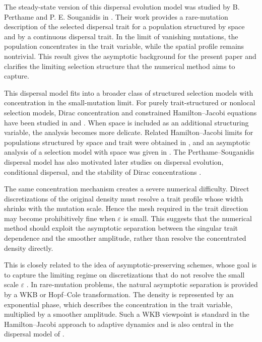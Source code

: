 \documentclass[11pt]{article}
\begin{document}
The steady-state version of this dispersal evolution model was studied by
B. Perthame and P. E. Souganidis in \cite{PerthameSouganidis}.  Their work provides a
rare-mutation description of the selected dispersal trait for a population
structured by space and by a continuous dispersal trait.  In the limit of
vanishing mutations, the population concentrates in the trait variable, while
the spatial profile remains nontrivial.  This result gives the asymptotic
background for the present paper and clarifies the limiting selection structure
that the numerical method aims to capture.




This dispersal model fits into a broader class of structured selection models with concentration in the small-mutation limit. For purely trait-structured or nonlocal selection models, Dirac concentration and constrained Hamilton--Jacobi equations have been studied in \cite{DesvillettesJabinMischlerRaoul} and \cite{LorzMirrahimiPerthame}. When space is included as an additional structuring variable, the analysis becomes more delicate. 
Related Hamilton--Jacobi limits for populations structured by space and trait were obtained in \cite{BouinMirrahimi}, and an asymptotic analysis of a selection model with space was given in \cite{MirrahimiPerthame}. 
The Perthame--Souganidis dispersal model has also motivated later studies on dispersal evolution, conditional dispersal, and the stability of Dirac concentrations \cite{HaoLamLou2019, Lam2017,LamLouPerthame2023}.



The same concentration mechanism creates a severe numerical difficulty.  Direct
discretizations of the original density must resolve a trait profile whose
width shrinks with the mutation scale.  Hence the mesh required in the trait
direction may become prohibitively fine when \(\varepsilon\) is small.  This
suggests that the numerical method should exploit the asymptotic separation
between the singular trait dependence and the smoother amplitude, rather than
resolve the concentrated density directly.

This is closely related to the idea of asymptotic-preserving schemes, whose
goal is to capture the limiting regime on discretizations that do not resolve
the small scale \(\varepsilon\) \cite{JinAP}.  In rare-mutation problems, the
natural asymptotic separation is provided by a WKB or Hopf--Cole
transformation.  The density is represented by an exponential phase, which
describes the concentration in the trait variable, multiplied by a smoother
amplitude.  Such a WKB viewpoint is standard in the Hamilton--Jacobi approach
to adaptive dynamics \cite{BarlesPerthame} and is also central in the
dispersal model of \cite{PerthameSouganidis}.
\end{document}
